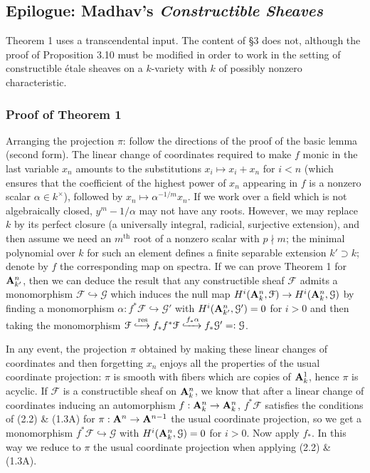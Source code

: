 \documentclass[deligne.tex]{subfiles}
\begin{document}
\subsection*{Epilogue: Madhav's \emph{Constructible Sheaves}}
Theorem 1 uses a transcendental input. The content of \S3 does not, although
the proof of Proposition 3.10 must be modified in order to work in the
setting of constructible étale sheaves on a $k$-variety with $k$ of
possibly nonzero characteristic.

\subsubsection*{Proof of Theorem 1}
Arranging the projection $\pi$: follow the directions of the proof of the 
basic lemma (second form). The linear change of coordinates required to make
$f$ monic in the last variable $x_n$ amounts to the substitutions
$x_i\mapsto x_i+x_n$ for $i<n$ (which ensures that the coefficient of the
highest power of $x_n$ appearing in $f$ is a nonzero scalar
$\alpha\in k^\times$), followed by $x_n\mapsto\alpha^{-1/m}x_n$.
If we work over a field which is not algebraically closed, $y^m-1/\alpha$
may not have any roots. However, we may replace $k$ by its perfect closure
(a universally integral, radicial, surjective extension), and then assume
we need an $m^{\text{th}}$ root of a nonzero scalar with $p\nmid m$; the
minimal polynomial over $k$ for such an element defines a finite separable
extension $k'\supset k$; denote by $f$ the corresponding map on spectra.
If we can prove Theorem 1 for $\mathbf{A}^n_{k'}$, then we
can deduce the result that any constructible sheaf $\mathcal F$ admits a
monomorphism $\mathcal F\hookrightarrow\mathcal G$ which induces the null
map $H^i(\mathbf{A}^n_k,\mathcal F)\rightarrow H^i(\mathbf{A}^n_k,\mathcal G)$ by finding a 
monomorphism $\alpha:f^*\mathcal F\hookrightarrow\mathcal G'$ with
$H^i(\mathbf{A}^n_{k'},\mathcal G')=0$ for $i>0$ and then taking the monomorphism
$\mathcal F\xhookrightarrow{\operatorname{res}}f_*f^*\mathcal F\xhookrightarrow{f_*\alpha}f_*\mathcal G'=:\mathcal G$.

In any event, the projection $\pi$ obtained by making these linear changes
of coordinates and then forgetting $x_n$ enjoys all the properties of the
usual coordinate projection: $\pi$ is smooth with fibers which are copies of
$\mathbf{A}^1_k$, hence $\pi$ is acyclic. If $\mathcal F$ is a constructible sheaf
on $\mathbf{A}^n_k$, we know that after a linear change of coordinates inducing an
automorphism $f:\mathbf{A}^n_k\rightarrow\mathbf{A}^n_k$, $f^*\mathcal F$ satisfies the conditions
of (2.2) \& (1.3A) for $\pi:\mathbf{A}^n\rightarrow\mathbf{A}^{n-1}$ the usual coordinate projection,
so we get a monomorphism $f^*\mathcal F\hookrightarrow\mathcal G$ with
$H^i(\mathbf{A}^n_k,\mathcal G)=0$ for $i>0$. Now apply $f_*$. In this way we reduce
to $\pi$ the usual coordinate projection when applying (2.2) \& (1.3A).
\end{document}

